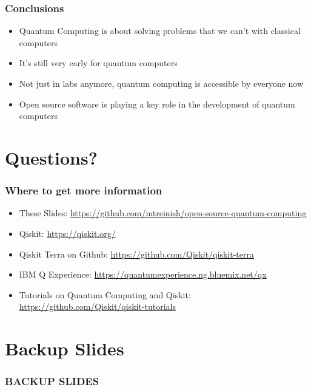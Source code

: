 \documentclass[aspectratio=169,11pt,hyperref={colorlinks=true}]{beamer}
\begin{document}
\begin{frame}
    \frametitle{Conclusions}
    \begin{itemize}
        \item Quantum Computing is about solving problems that we can't with
            classical computers
        \item It's still very early for quantum computers
        \item Not just in labs anymore, quantum computing is accessible by
            everyone now
        \item Open source software is playing a key role in the development of quantum computers
    \end{itemize}
\end{frame}

\section{Questions?}
\begin{frame}
\frametitle{Where to get more information}
    \begin{itemize}
        \item These Slides: \href{https://github.com/mtreinish/open-source-quantum-computing}{https://github.com/mtreinish/open-source-quantum-computing}
        \item Qiskit: \href{https://qiskit.org/}{https://qiskit.org/}
        \item Qiskit Terra on Github: \href{https://github.com/Qiskit/qiskit-terra}{https://github.com/Qiskit/qiskit-terra}
        \item IBM Q Experience: \href{https://quantumexperience.ng.bluemix.net/qx}{https://quantumexperience.ng.bluemix.net/qx}
        \item Tutorials on Quantum Computing and Qiskit: \href{https://github.com/Qiskit/qiskit-tutorials}{https://github.com/Qiskit/qiskit-tutorials}
    \end{itemize}
\end{frame}

\section{Backup Slides}
\begin{frame}[noframenumbering]
    \frametitle{BACKUP SLIDES}
\end{frame}
\end{document}
